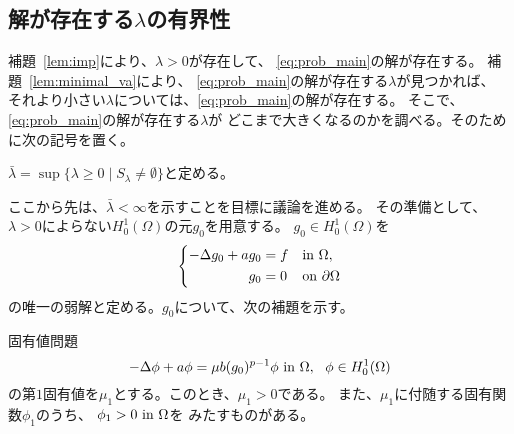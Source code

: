 \subsection{解が存在する$\lambda$の有界性}

補題~\ref{lem:imp}により、$\lambda > 0$が存在して、
\ref{eq:prob_main}の解が存在する。
補題~\ref{lem:minimal_va}により、
\ref{eq:prob_main}の解が存在する$\lambda$が見つかれば、
それより小さい$\lambda$については、\ref{eq:prob_main}の解が存在する。
そこで、\ref{eq:prob_main}の解が存在する$\lambda$が
どこまで大きくなるのかを調べる。そのために次の記号を置く。

\begin{nota}
 $\bar{\lambda} = \sup \{ \lambda \geq 0 \mid S_\lambda \neq \emptyset
 \}$と定める。
\end{nota}

ここから先は、$\bar{\lambda} < \infty$を示すことを目標に議論を進める。
その準備として、$\lambda > 0$によらない$H_0^1(\Omega)$の元$g_0$を用意する。
$g_0 \in H_0^1(\Omega)$を
\begin{align}
 \left\{
 \begin{aligned}
    -\Delta g_0 + a g_0 
  &= f  & &\text{in}~ \Omega,  \\
  g_0 &= 0 & &\text{on}~ \partial\Omega
 \end{aligned}
 \right. \label{eq:g_0}
\end{align}
の唯一の弱解と定める。$g_0$について、次の補題を示す。

\begin{lem} \label{lem:g_0}
 固有値問題
 \[
  -\Delta \phi + a \phi = \mu b (g_0)^{p-1}\phi ~\text{in}~ \Omega, \ \
 \phi \in H_0^1(\Omega)
 \]
 の第$1$固有値を$\mu_1$とする。このとき、$\mu_1 > 0$である。
 また、$\mu_1$に付随する固有関数$\phi_1$のうち、
 $\phi_1 > 0 ~\text{in}~ \Omega$を
 みたすものがある。
\end{lem}

